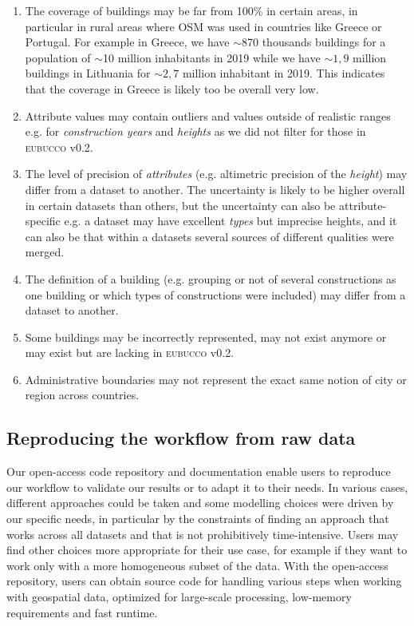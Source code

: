 \documentclass[fleqn,10pt]{wlscirep}
\begin{document}
\begin{enumerate}[topsep=0.2pt]
    \itemsep-0.15em 
    \item The coverage of buildings may be far from 100\% in certain areas, in particular in rural areas where OSM was used in countries like Greece or Portugal. For example in Greece, we have $\sim$870 thousands buildings for a population of $\sim$10 million inhabitants in 2019\cite{un19} while we have $\sim1,9$ million buildings in Lithuania for $\sim 2,7$ million inhabitant in 2019\cite{un19}. This indicates that the coverage in Greece is likely too be overall very low.
    \item Attribute values may contain outliers and values outside of realistic ranges e.g. for \textit{construction years} and \textit{heights} as we did not filter for those in \textsc{eubucco} v0.2.
    \item The level of precision of \textit{attributes} (e.g. altimetric precision of the \textit{height}) may differ from a dataset to another. The uncertainty is likely to be higher overall in certain datasets than others, but the uncertainty can also be attribute-specific e.g. a dataset may have excellent \textit{types} but imprecise heights, and it can also be that within a datasets several sources of different qualities were merged.
    \item The definition of a building (e.g. grouping or not of several constructions as one building or which types of constructions were included) may differ from a dataset to another.
    \item Some buildings may be incorrectly represented, may not exist anymore or may exist but are lacking in \textsc{eubucco} v0.2.
    \item Administrative boundaries may not represent the exact same notion of city or region across countries.  

\end{enumerate}


\subsection*{Reproducing the workflow from raw data}
Our open-access code repository\cite{eubucco-0.2-code2022} and documentation enable users to reproduce our workflow to validate our results or to adapt it to their needs. In various cases, different approaches could be taken and some modelling choices were driven by our specific needs, in particular by the constraints of finding an approach that works across all datasets and that is not prohibitively time-intensive. Users may find other choices more appropriate for their use case, for example if they want to work only with a more homogeneous subset of the data. With the open-access repository, users can obtain source code for handling various steps when working with geospatial data, optimized for large-scale processing, low-memory requirements and fast runtime. 
\end{document}

